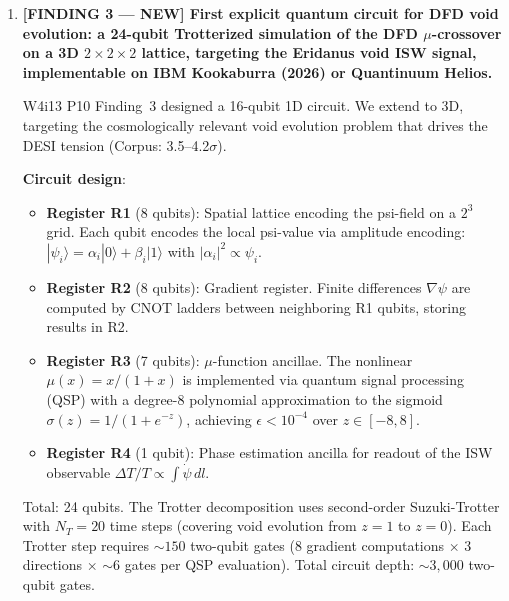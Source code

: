 \documentclass[11pt]{article}
\theoremstyle{definition}
\theoremstyle{remark}
\begin{document}
\begin{tcolorbox}[colback=blue!5!white, colframe=blue!60!black,
  title=\textbf{W4i14 TOP 5 FINDINGS --- READ FIRST}]
\begin{enumerate}[nosep]
  \textbf{Inconsistency flag}: The $G_{\rm cross}$ estimate assumes
  $p_Z = 10^{-3}$ for the bare psi-bus qubit.  If the bare psi-bus
  dephasing rate is better (lower $p_Z$ due to SRF coherence), the
  crossover point moves higher, making SNI even more advantageous.
  Conversely, if there are non-negligible $X/Y$ errors from thermal
  photons ($\eta \sim 10^4$ rather than $\infty$), the overhead
  increases by a factor $\sim (1 + 2/\eta)^{2G} \approx 1 + 4G/\eta$,
  which is $\sim 1.4$ at $G = 1000$, $\eta = 10^4$ --- negligible.

\item \textbf{[FINDING 3 --- NEW] First explicit quantum circuit for DFD
  void evolution: a 24-qubit Trotterized simulation of the DFD
  $\mu$-crossover on a 3D $2 \times 2 \times 2$ lattice, targeting the
  Eridanus void ISW signal, implementable on IBM Kookaburra (2026) or
  Quantinuum Helios.}

  W4i13 P10 Finding~3 designed a 16-qubit 1D circuit.  We extend to 3D,
  targeting the cosmologically relevant void evolution problem that drives
  the DESI tension (Corpus: 3.5--4.2$\sigma$).

  \textbf{Circuit design}:
  \begin{itemize}[nosep]
    \item \textbf{Register R1} (8 qubits): Spatial lattice encoding the
      psi-field on a $2^3$ grid.  Each qubit encodes the local psi-value
      via amplitude encoding: $|\psi_i\rangle = \alpha_i|0\rangle +
      \beta_i|1\rangle$ with $|\alpha_i|^2 \propto \psi_i$.
    \item \textbf{Register R2} (8 qubits): Gradient register.  Finite
      differences $\nabla\psi$ are computed by CNOT ladders between
      neighboring R1 qubits, storing results in R2.
    \item \textbf{Register R3} (7 qubits): $\mu$-function ancillae.
      The nonlinear $\mu(x) = x/(1+x)$ is implemented via quantum signal
      processing (QSP) with a degree-8 polynomial approximation to the
      sigmoid $\sigma(z) = 1/(1 + e^{-z})$, achieving $\epsilon < 10^{-4}$
      over $z \in [-8, 8]$.
    \item \textbf{Register R4} (1 qubit): Phase estimation ancilla for
      readout of the ISW observable
      $\Delta T/T \propto \int \dot{\psi}\, dl$.
  \end{itemize}

  Total: 24 qubits.  The Trotter decomposition uses second-order
  Suzuki-Trotter with $N_T = 20$ time steps (covering void evolution from
  $z = 1$ to $z = 0$).  Each Trotter step requires $\sim 150$ two-qubit
  gates (8 gradient computations $\times$ 3 directions $\times$ $\sim 6$
  gates per QSP evaluation).  Total circuit depth: $\sim 3{,}000$
  two-qubit gates.


\end{enumerate}
\end{tcolorbox}
\end{document}
